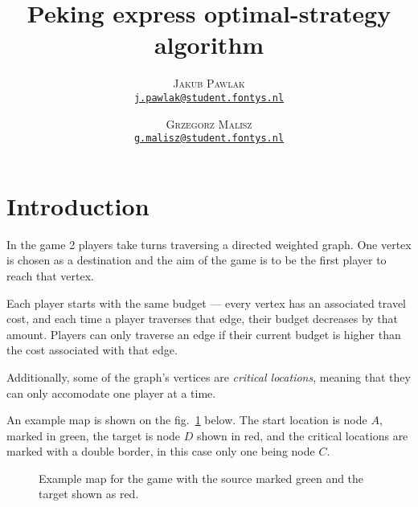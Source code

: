 \documentclass[12pt]{article}
\author{
    \textsc{Jakub Pawlak}\\
    \href{mailto:j.pawlak@student.fontys.nl}{\texttt{j.pawlak@student.fontys.nl}}
    \and 
    \textsc{Grzegorz Malisz}\\
    \href{mailto:g.malisz@student.fontys.nl}{\texttt{g.malisz@student.fontys.nl}}
}
\title{\sffamily\bfseries\Huge Peking express optimal-strategy algorithm}
\begin{document}
\begin{titlepage}
    \maketitle
    \thispagestyle{empty}
    \tableofcontents
    \restoregeometry
\end{titlepage}
\setcounter{page}{2}

\section{Introduction}

In the game 2 players take turns traversing a directed weighted graph.
One vertex is chosen as a destination and the aim of the game is to be the first player to reach that vertex.

Each player starts with the same budget --- every vertex has an associated travel cost, and each time a player traverses that edge, their budget decreases by that amount.
Players can only traverse an edge if their current budget is higher than the cost associated with that edge.

Additionally, some of the graph's vertices are \emph{critical locations}, meaning that they can only accomodate one player at a time.

An example map is shown on the fig.~\ref*{fig:example-map} below.
The start location is node $A$, marked in green, the target is node $D$ shown in red,
and the critical locations are marked with a double border, in this case only one being node $C$.

\begin{figure}[H]\centering
    \caption{Example map for the game with the source marked green and the target shown as red.}
    \label{fig:example-map}
\end{figure}
\end{document}
